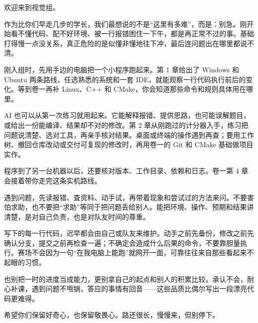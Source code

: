 欢迎来到视觉组。

作为比你们早走几步的学长，我们最想说的不是“这里有多难”，而是：别急。刚开始看不懂代码、配不好环境、被一行报错困住一下午，都是再正常不过的事。基础打得慢一点没关系，真正危险的是似懂非懂地往下冲，最后连问题出在哪里都说不清。

刚入组时，先用手边的电脑把一个小程序跑起来。第 1 章给出了 Windows 和 Ubuntu 两条路线，任选熟悉的系统和一套 IDE，就能观察一行代码执行前后的变化。等到卷一再补 Linux、C++ 和 CMake，你会知道那些命令和规则具体用在哪里。

AI 也可以从第一次练习就用起来。它能解释报错、提供思路，也可能误解题目，或给出一份能编译、结果却不对的修改。第 2 章从刚跑过的计分器入手，练习把问题说清楚、选对工具，再亲手核对结果。桌面或终端的操作遇到再查；要用工作树、撤回仓库改动或交付可复现的修改时，再用卷一的 Git 和 CMake 基础做项目实作。

程序到了另一台机器以后，还要核对版本、工作目录、依赖和日志。卷一第 4 章会接着带你走完这条实机路线。

遇到问题，先读报错、查资料、动手试，再带着现象和尝试过的方法来问。不要害怕求助，也不要把“求助”等同于把问题丢给别人。能把环境、操作、预期和结果讲清楚，是对自己负责，也是对队友时间的尊重。

写下的每一行代码，迟早都会由自己或队友来维护。动手之前先备份，修改之前先确认分支，提交之前再检查一遍；不确定会造成什么后果的命令，不要靠胆量执行。赛场不会因为一句“在我电脑上能跑”就网开一面，可靠往往来自那些看起来不起眼的习惯。

也别把一时的进度当成能力，更别拿自己的起点和别人的积累比较。承认不会，耐心补课，遇到问题不甩锅，答应的事情有回音——这些品质比偶尔写出一段漂亮代码更难得。

希望你们保留好奇心，也保留敬畏心。路还很长，慢慢来，但别停下。
